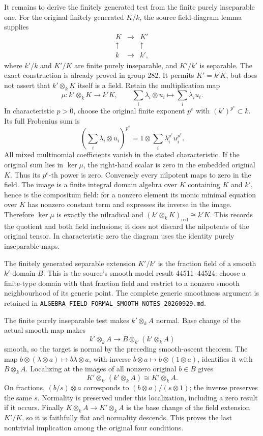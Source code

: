 It remains to derive the finitely generated test from the finite purely inseparable one. For the original finitely generated \(K/k\), the source field-diagram lemma supplies \[
 \begin{matrix}K&\longrightarrow&K'\\ \uparrow&&\uparrow\\ k&\longrightarrow&k',\end{matrix}
\] where \(k'/k\) and \(K'/K\) are finite purely inseparable, and \(K'/k'\) is separable. The exact construction is already proved in group 282. It permits \(K'=k'K\), but does not assert that \(k'\otimes_kK\) itself is a field. Retain the multiplication map \[
 \mu:k'\otimes_kK\longrightarrow k'K,\qquad
 \sum_i\lambda_i\otimes u_i\longmapsto\sum_i\lambda_iu_i.
\] In characteristic \(p>0\), choose the original finite exponent \(p^e\) with \((k')^{p^e}\subset k\). Its full Frobenius sum is \[
 \left(\sum_i\lambda_i\otimes u_i\right)^{p^e}
 =1\otimes\sum_i\lambda_i^{p^e}u_i^{p^e}.
\] All mixed multinomial coefficients vanish in the stated characteristic. If the original sum lies in \(\ker\mu\), the right-hand scalar is zero in the embedded original \(K\). Thus its \(p^e\)-th power is zero. Conversely every nilpotent maps to zero in the field. The image is a finite integral domain algebra over \(K\) containing \(K\) and \(k'\), hence is the compositum field: for a nonzero element its monic minimal equation over \(K\) has nonzero constant term and expresses its inverse in the image. Therefore \(\ker\mu\) is exactly the nilradical and \((k'\otimes_kK)_{\mathrm{red}}\cong k'K\). This records the quotient and both field inclusions; it does not discard the nilpotents of the original tensor. In characteristic zero the diagram uses the identity purely inseparable maps.

The finitely generated separable extension \(K'/k'\) is the fraction field of a smooth \(k'\)-domain \(B\). This is the source's smooth-model result 44511--44524: choose a finite-type domain with that fraction field and restrict to a nonzero smooth neighbourhood of its generic point. The complete generic smoothness argument is retained in \texttt{ALGEBRA\_FIELD\_FORMAL\_SMOOTH\_NOTES\_20260929.md}.

The finite purely inseparable test makes \(k'\otimes_kA\) normal. Base change of the actual smooth map makes \[
 k'\otimes_kA\longrightarrow B\otimes_{k'}(k'\otimes_kA)
\] smooth, so the target is normal by the preceding smooth-ascent theorem. The map \(b\otimes(\lambda\otimes a)\mapsto b\lambda\otimes a\), with inverse \(b\otimes a\mapsto b\otimes(1\otimes a)\), identifies it with \(B\otimes_kA\). Localizing at the images of all nonzero original \(b\in B\) gives \[
 K'\otimes_{k'}(k'\otimes_kA)\cong K'\otimes_kA.
\] On fractions, \((b/s)\otimes a\) corresponds to \((b\otimes a)/(s\otimes1)\); the inverse preserves the same \(s\). Normality is preserved under this localization, including a zero result if it occurs. Finally \(K\otimes_kA\to K'\otimes_kA\) is the base change of the field extension \(K'/K\), so it is faithfully flat and normality descends. This proves the last nontrivial implication among the original four conditions.

